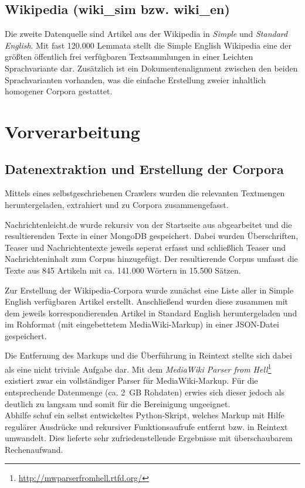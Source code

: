 \documentclass[11pt, a4paper]{article}
\begin{document}
\subsection{Wikipedia (wiki\_sim bzw. wiki\_en)}
\label{corp-wiki}
Die zweite Datenquelle sind Artikel aus der Wikipedia in \emph{Simple} und
\emph{Standard English}. Mit fast 120.000 Lemmata stellt die Simple English
Wikipedia eine der gr\"o\ss{}ten \"offentlich frei verf\"ugbaren Textsammlungen
in einer Leichten Sprachvariante dar.
Zus\"atzlich ist ein Dokumentenalignment zwischen den beiden Sprachvarianten
vorhanden, was die einfache Erstellung zweier inhaltlich homogener Corpora
gestattet.


\section{Vorverarbeitung}
\label{sec:vorverarb}

\subsection{Datenextraktion und Erstellung der Corpora}
\label{datextr}

Mittels eines selbstgeschriebenen Crawlers wurden die relevanten Textmengen
heruntergeladen, extrahiert und zu Corpora zusammengefasst.

Nachrichtenleicht.de wurde rekursiv von der Startseite aus abgearbeitet
und die resultierenden Texte in einer MongoDB gespeichert.
Dabei wurden Überschriften, Teaser und Nachrichtentexte jeweils seperat erfasst
und schließlich Teaser und Nachrichteninhalt zum Corpus hinzugefügt.
Der resultierende Corpus umfasst die Texte aus 845 Artikeln mit ca. 141.000
Wörtern in 15.500 Sätzen.

Zur Erstellung der Wikipedia-Corpora wurde zunächst eine Liste aller
in Simple English verfügbaren Artikel erstellt. Anschließend wurden diese
zusammen mit dem jeweils korrespondierenden Artikel in Standard English
heruntergeladen und im Rohformat (mit eingebettetem MediaWiki-Markup) in einer
JSON-Datei gespeichert.

Die Entfernung des Markups und die Überführung in Reintext stellte
sich dabei als eine nicht triviale Aufgabe dar.
Mit dem \emph{MediaWiki Parser from
Hell}\footnote{\url{http://mwparserfromhell.rtfd.org/}} existiert zwar ein
vollständiger Parser für MediaWiki-Markup.
Für die entsprechende Datenmenge (ca. 2~GB Rohdaten) erwies sich dieser jedoch
als deutlich zu langsam und somit für die Bereinigung ungeeignet.
\\
Abhilfe schuf ein selbst entwickeltes Python-Skript, welches Markup mit Hilfe
regul\"arer Ausdr\"ucke und rekursiver Funktionsaufrufe entfernt bzw. in
Reintext umwandelt.
Dies lieferte sehr zufriedenstellende Ergebnisse mit überschaubarem
Rechenaufwand.
\end{document}

